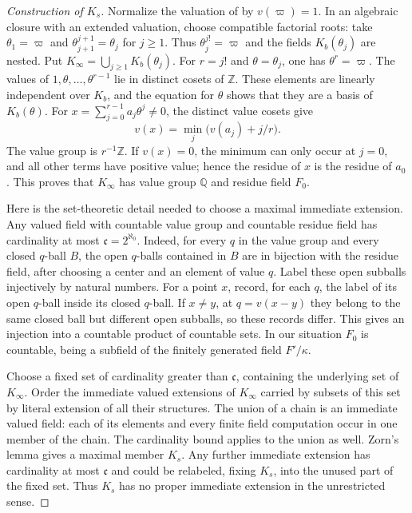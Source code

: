 \begin{proof}[Construction of $K_s$]
Normalize the valuation of  by $v(\varpi)=1$.
In an algebraic closure with an extended valuation, choose compatible
factorial roots: take $\theta_1=\varpi$ and
$\theta_{j+1}^{j+1}=\theta_j$ for $j\geq1$. Thus
$\theta_j^{j!}=\varpi$ and the fields $K_b(\theta_j)$ are nested.
Put $K_\infty=\bigcup_{j\geq1}K_b(\theta_j)$.
For $r=j!$ and $\theta=\theta_j$, one has $\theta^r=\varpi$.
The values of $1,\theta,\ldots,\theta^{r-1}$ lie in distinct cosets of
$\mathbb Z$.  These elements are linearly independent over $K_b$, and
the equation for $\theta$ shows that they are a basis of $K_b(\theta)$.
For $x=\sum_{j=0}^{r-1}a_j\theta^j\ne0$, the distinct value cosets give
\[
                  v(x)=\min_j\bigl(v(a_j)+j/r\bigr).
\]
The value group is $r^{-1}\mathbb Z$.  If $v(x)=0$, the minimum can only
occur at $j=0$, and all other terms have positive value; hence the residue
of $x$ is the residue of $a_0$.  This proves that $K_\infty$ has value
group $\mathbb Q$ and residue field $F_0$.

Here is the set-theoretic detail needed to choose a maximal immediate
extension.  Any valued field with countable value group and countable
residue field has cardinality at most $\mathfrak c=2^{\aleph_0}$.
Indeed, for every $q$ in the value group and every closed $q$-ball $B$,
the open $q$-balls contained in $B$ are in bijection with the residue
field, after choosing a center and an element of value $q$.
Label these open subballs injectively by natural numbers.
For a point $x$, record, for each $q$, the label of its open $q$-ball
inside its closed $q$-ball.  If $x\ne y$, at $q=v(x-y)$ they belong to
the same closed ball but different open subballs, so these records
differ.  This gives an injection into a countable product of countable
sets.  In our situation $F_0$ is countable, being a subfield of the
finitely generated field $F'/\kappa$.

Choose a fixed set of cardinality greater than $\mathfrak c$, containing
the underlying set of $K_\infty$.  Order the immediate valued extensions
of $K_\infty$ carried by subsets of this set by literal extension of all
their structures.  The union of a chain is an immediate valued field:
each of its elements and every finite field computation occur in one
member of the chain.  The cardinality bound applies to the union as
well.  Zorn's lemma gives a maximal member $K_s$.  Any further immediate
extension has cardinality at most $\mathfrak c$ and could be relabeled,
fixing $K_s$, into the unused part of the fixed set.  Thus $K_s$ has no
proper immediate extension in the unrestricted sense.


\end{proof}
